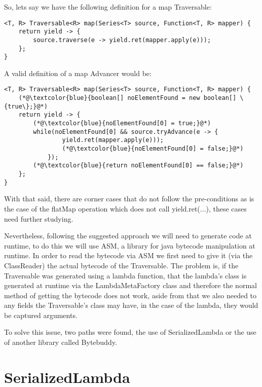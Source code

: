 So, lets say we have the following definition for a map Traversable:
\begin{lstlisting}[caption={Map Traversable},captionpos=b]
<T, R> Traversable<R> map(Series<T> source, Function<T, R> mapper) {
	return yield -> {
    	source.traverse(e -> yield.ret(mapper.apply(e)));
	};
}
\end{lstlisting}

A valid definition of a map Advancer would be:

\begin{lstlisting}[caption={Map Traversable},captionpos=b]
<T, R> Traversable<R> map(Series<T> source, Function<T, R> mapper) {
	(*@\textcolor{blue}{boolean[] noElementFound = new boolean[] \{true\};}@*)
	return yield -> {
		(*@\textcolor{blue}{noElementFound[0] = true;}@*)
		while(noElementFound[0] && source.tryAdvance(e -> {
				yield.ret(mapper.apply(e)));
				(*@\textcolor{blue}{noElementFound[0] = false;}@*)
			});
		(*@\textcolor{blue}{return noElementFound[0] == false;}@*)
	};
}
\end{lstlisting}

With that said, there are corner cases that do not follow the pre-conditions as is the case of the flatMap operation which does not call yield.ret(...), these cases need further studying.

Nevertheless, following the suggested approach we will need to generate code at runtime, to do this we will use ASM, a library for java bytecode manipulation at runtime. In order to read the bytecode via ASM we first need to give it (via the ClassReader) the actual bytecode of the Traversable. The problem is, if the Traversable was generated using a lambda function, that the lambda's class is generated at runtime via the LambdaMetaFactory class and therefore the normal method of getting the bytecode does not work, aside from that we also needed to any fields the Traversable's class may have, in the case of the lambda, they would be captured arguments.

To solve this issue, two paths were found\citep{stackoverflowlambdacode}, the use of SerializedLambda\citep{serializedlambda} or the use of another library called Bytebuddy.

\section{SerializedLambda}

